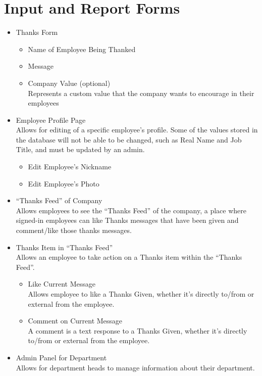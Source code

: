 \documentclass[11pt]{report}
\begin{document}
\section{Input and Report Forms}
\begin{itemize}
    \item Thanks Form
    \begin{itemize}
        \item Name of Employee Being Thanked
        \item Message
        \item Company Value (optional) \\
        Represents a custom value that the company wants to encourage in their employees
    \end{itemize}
    \item Employee Profile Page \\
    Allows for editing of a specific employee's profile. Some of the values stored in the database will not be able to be changed, such as Real Name and Job Title, and must be updated by an admin.
    \begin{itemize}
        \item Edit Employee's Nickname
        \item Edit Employee's Photo
    \end{itemize}
    \item ``Thanks Feed'' of Company \\
    Allows employees to see the ``Thanks Feed'' of the company, a place where signed-in employees can like Thanks messages that have been given and comment/like those thanks messages.
    \item Thanks Item in ``Thanks Feed'' \\
    Allows an employee to take action on a Thanks item within the ``Thanks Feed''.
    \begin{itemize}
        \item Like Current Message \\
        Allows employee to like a Thanks Given, whether it's directly to/from or external from the employee.
        \item Comment on Current Message \\
        A comment is a text response to a Thanks Given, whether it's directly to/from or external from the employee.
    \end{itemize}
    \item Admin Panel for Department \\
    Allows for department heads to manage information about their department.

\end{itemize}
\end{document}
